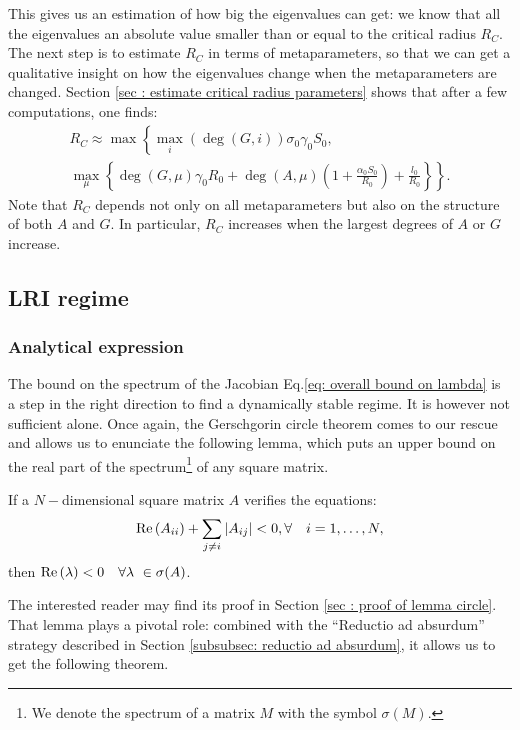 \documentclass[12pt, titlepage]{report}
\begin{document}
This gives us an estimation of how big the eigenvalues can get: we know that all the eigenvalues  an absolute value smaller than or equal to the critical radius $R_C$.
The next step is to estimate $R_C$ in terms of metaparameters, so that we can get a qualitative insight on how the eigenvalues change when the metaparameters are changed. Section \ref{sec : estimate critical radius parameters} shows that after a few computations, one finds:
\begin{multline}
R_C \approx \max\left\{ \max_i\left(\deg(G,i)\right) \sigma_0 \gamma_0 S_0 \right., \\
 \left. \max_\mu\left\{\deg(G,\mu) \gamma_0 R_0 + \deg(A,\mu)\left(1+\frac{\alpha_0S_0}{R_0}\right)+\frac{l_0}{R_0}\right\}\right\}. \label{eq: estimate R_C metaparameters}
\end{multline}
Note that $R_C$ depends not only on all metaparameters but also on the structure of both $A$ and $G$. In particular, $R_C$ increases when the largest degrees of $A$ or $G$ increase.



\subsection{LRI regime}
\subsubsection{Analytical expression}\label{sec : strong LRI regime methods}
The bound on the spectrum of the Jacobian Eq.\eqref{eq: overall bound on lambda} is a step in the right direction to find a dynamically stable regime. It is however not sufficient alone. Once again, the Gerschgorin circle theorem comes to our rescue and allows us to enunciate the following lemma, which puts an upper bound on the real part of the spectrum\footnote{We denote the spectrum of a matrix $M$ with the symbol $\sigma(M)$. } of any square matrix.
\begin{lemma}\label{lemma: lemma Gerschgorin circle}
If a $N-$dimensional square matrix $A$ verifies the equations:
\begin{equation}
\text{Re}\left(A_{ii}\right) + \sum_{j\neq i} \left|{A_{ij}}\right| < 0, \forall \quad i=1, \dots, N, \label{eq: alternative version circle theorem}
\end{equation}
then $\real{\lambda} < 0 \quad \forall \lambda \in \sigma(A)$.
\end{lemma}
\noindent The interested reader may find its proof in Section \ref{sec : proof of lemma circle}. That lemma plays a pivotal role: combined with the ``Reductio ad absurdum'' strategy described in Section \ref{subsubsec: reductio ad absurdum}, it allows us to get the following theorem.
\end{document}
